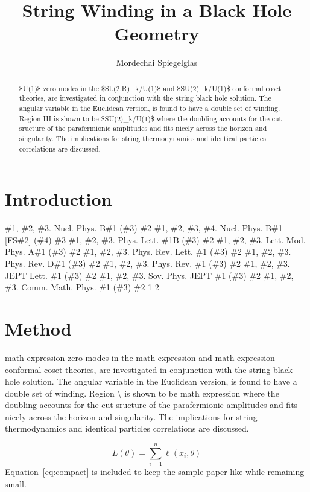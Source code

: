 \documentclass[11pt]{article}
\title{String Winding in a Black Hole Geometry}
\author{Mordechai Spiegelglas}
\date{}
\begin{document}
\maketitle
\begin{abstract}

\$U(1)\$ zero modes in the \$SL(2,R)\_k/U(1)\$ and \$SU(2)\_k/U(1)\$ conformal coset theories, are investigated in conjunction with the string black hole solution. The angular variable in the Euclidean version, is found to have a double set of winding. Region III is shown to be \$SU(2)\_k/U(1)\$ where the doubling accounts for the cut sructure of the parafermionic amplitudes and fits nicely across the horizon and singularity. The implications for string thermodynamics and identical particles correlations are discussed.

\end{abstract}

\section{Introduction}

\#1, \#2, \#3. Nucl. Phys. B\#1 (\#3) \#2 \#1, \#2, \#3, \#4. Nucl. Phys. B\#1 [FS\#2] (\#4) \#3 \#1, \#2, \#3. Phys. Lett. \#1B (\#3) \#2 \#1, \#2, \#3. Lett. Mod. Phys. A\#1 (\#3) \#2 \#1, \#2, \#3. Phys. Rev. Lett. \#1 (\#3) \#2 \#1, \#2, \#3. Phys. Rev. D\#1 (\#3) \#2 \#1, \#2, \#3. Phys. Rev. \#1 (\#3) \#2 \#1, \#2, \#3. JEPT Lett. \#1 (\#3) \#2 \#1, \#2, \#3. Sov. Phys. JEPT \#1 (\#3) \#2 \#1, \#2, \#3. Comm. Math. Phys. \#1 (\#3) \#2 1 2

\section{Method}

math expression zero modes in the math expression and math expression conformal coset theories, are investigated in conjunction with the string black hole solution. The angular variable in the Euclidean version, is found to have a double set of winding. Region \textbackslash{} is shown to be math expression where the doubling accounts for the cut sructure of the parafermionic amplitudes and fits nicely across the horizon and singularity. The implications for string thermodynamics and identical particles correlations are discussed.

\begin{equation}
\label{eq:compact}
L(\theta) = \sum_{i=1}^{n} \ell(x_i, \theta)
\end{equation}
Equation~\ref{eq:compact} is included to keep the sample paper-like while remaining small.
\end{document}
